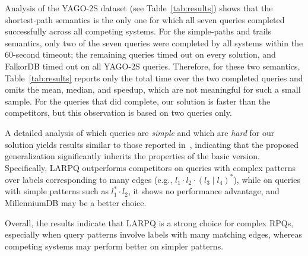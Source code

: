 Analysis of the YAGO-2S dataset (see Table~\ref{tab:results}) shows that the shortest‑path semantics is the only one for which all seven queries completed successfully across all competing systems.
For the simple‑paths and trails semantics, only two of the seven queries were completed by all systems within the 60-second timeout; the remaining queries timed out on every solution, and FalkorDB timed out on all YAGO-2S queries.
Therefore, for these two semantics, Table~\ref{tab:results} reports only the total time over the two completed queries and omits the mean, median, and speedup, which are not meaningful for such a small sample.
For the queries that did complete, our solution is faster than the competitors, but this observation is based on two queries only.

A detailed analysis of which queries are \emph{simple} and which are \emph{hard} for our solution yields results similar to those reported in~\cite{belyanin2150single}, indicating that the proposed generalization significantly inherits the properties of the basic version. Specifically, LARPQ outperforms competitors on queries with complex patterns over labels corresponding to many edges (e.g., $l_1 \cdot l_2 \cdot (l_3 \mid l_4)^*$), while on queries with simple patterns such as $l_1^* \cdot  l_2$, it shows no performance advantage, and MillenniumDB may be a better choice.

Overall, the results indicate that LARPQ is a strong choice for complex RPQs, especially when query patterns involve labels with many matching edges, whereas competing systems may perform better on simpler patterns.

